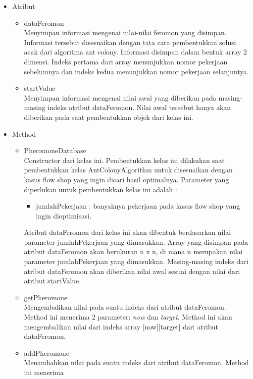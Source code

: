 \begin{itemize}
		\begin{itemize}
			\item Atribut
			\begin{itemize}
				\item dataFeromon \\
				Menyimpan informasi mengenai nilai-nilai feromon yang disimpan. Informasi tersebut
				disesuaikan dengan tata cara pembentukkan solusi acak dari algoritma ant
				colony. Informasi disimpan dalam bentuk array 2 dimensi. Indeks pertama dari
				array menunjukkan nomor pekerjaan sebelumnya dan indeks kedua menunjukkan
				nomor pekerjaan selanjuntya.
				\item startValue \\
				Menyimpan informasi mengenai nilai awal yang diberikan pada masing-masing indeks
				atribut dataFeromon. Nilai awal tersebut hanya akan diberikan pada saat
				pembentukkan objek dari kelas ini.
			\end{itemize}
			\item Method
			\begin{itemize}
				\item PheromoneDatabase \\
				Constructor dari kelas ini. Pembentukkan kelas ini dilakukan saat pembentukkan
				kelas AntColonyAlgorithm untuk disesuaikan dengan kasus flow shop yang
				ingin dicari hasil optimalnya. Parameter yang diperlukan untuk pembentukkan kelas
				ini adalah :
				\begin{itemize}
					\item jumlahPekerjaan : banyaknya pekerjaan pada kasus flow shop yang ingin
					dioptimisasi.
				\end{itemize}
				Atribut dataFeromon dari kelas ini akan dibentuk berdasarkan nilai parameter jumlahPekerjaan
				yang dimasukkan. Array yang disimpan pada atribut dataFeromon
				akan berukuran n x n, di mana n merupakan nilai parameter jumlahPekerjaan yang
				dimasukkan. Masing-masing indeks dari atribut dataFeromon akan diberikan nilai
				awal sesuai dengan nilai dari atribut startValue.
				\item getPheromone \\
				Mengembalikan nilai pada suatu indeks dari atribut dataFeromon. Method ini menerima
				2 parameter: \textit{now} dan \textit{target}. Method ini akan mengembalikan nilai dari
				indeks array [now][target] dari atribut dataFeromon.
				\item addPheromone \\
				Menambahkan nilai pada suatu indeks dari atribut dataFeromon. Method ini menerima

\end{itemize}
\end{itemize}
\end{itemize}
